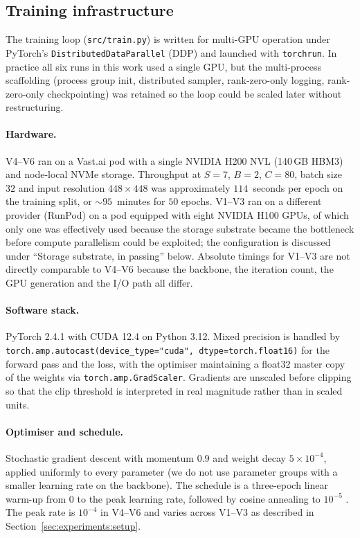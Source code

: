 \subsection{Training infrastructure}
\label{sec:impl:training}

The training loop (\texttt{src/train.py}) is written for multi-GPU operation
under PyTorch's \texttt{DistributedDataParallel} (DDP) and launched with
\texttt{torchrun}. In practice all six runs in this work used a single GPU,
but the multi-process scaffolding (process group init, distributed sampler,
rank-zero-only logging, rank-zero-only checkpointing) was retained so the
loop could be scaled later without restructuring.

\paragraph{Hardware.} V4--V6 ran on a Vast.ai pod with a single NVIDIA H200
NVL (140\,GB HBM3) and node-local NVMe storage. Throughput at $S = 7$,
$B = 2$, $C = 80$, batch size $32$ and input resolution $448\times 448$ was
approximately $114$~seconds per epoch on the training split, or
$\sim\!95$~minutes for $50$ epochs. V1--V3 ran on a different provider
(RunPod) on a pod equipped with eight NVIDIA H100 GPUs, of which only one
was effectively used because the storage substrate became the bottleneck
before compute parallelism could be exploited; the configuration is
discussed under ``Storage substrate, in passing'' below. Absolute timings
for V1--V3 are not directly comparable to V4--V6 because the backbone, the
iteration count, the GPU generation and the I/O path all differ.

\paragraph{Software stack.} PyTorch 2.4.1 with CUDA 12.4 on Python 3.12.
Mixed precision is handled by \texttt{torch.amp.autocast(device\_type="cuda",
dtype=torch.float16)} for the forward pass and the loss, with the optimiser
maintaining a float32 master copy of the weights via
\texttt{torch.amp.GradScaler}. Gradients are unscaled before clipping so that
the clip threshold is interpreted in real magnitude rather than in scaled
units.

\paragraph{Optimiser and schedule.} Stochastic gradient descent with momentum
$0.9$ and weight decay $5\!\times\!10^{-4}$, applied uniformly to every
parameter (we do not use parameter groups with a smaller learning rate on the
backbone). The schedule is a three-epoch linear warm-up from $0$ to the peak
learning rate, followed by cosine annealing to $10^{-5}$
\citep{loshchilov2017sgdr}. The peak rate is $10^{-4}$ in V4--V6 and varies
across V1--V3 as described in Section~\ref{sec:experiments:setup}.

